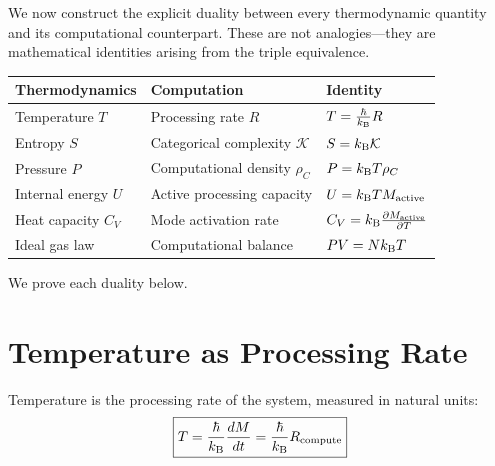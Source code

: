 We now construct the explicit duality between every thermodynamic quantity and its computational counterpart. These are not analogies---they are mathematical identities arising from the triple equivalence.

\begin{center}
\begin{tabular}{lll}
\toprule
\textbf{Thermodynamics} & \textbf{Computation} & \textbf{Identity} \\
\midrule
Temperature $T$ & Processing rate $R$ & $T = \frac{\hbar}{k_{\mathrm{B}}} R$ \\[4pt]
Entropy $S$ & Categorical complexity $\mathcal{K}$ & $S = k_{\mathrm{B}} \mathcal{K}$ \\[4pt]
Pressure $P$ & Computational density $\rho_C$ & $P = k_{\mathrm{B}} T \rho_C$ \\[4pt]
Internal energy $U$ & Active processing capacity & $U = k_{\mathrm{B}} T M_{\mathrm{active}}$ \\[4pt]
Heat capacity $C_V$ & Mode activation rate & $C_V = k_{\mathrm{B}} \frac{\partial M_{\mathrm{active}}}{\partial T}$ \\[4pt]
Ideal gas law & Computational balance & $PV = Nk_{\mathrm{B}} T$ \\
\bottomrule
\end{tabular}
\end{center}

We prove each duality below.

\section{Temperature as Processing Rate}
\label{sec:temp_rate}

\begin{theorem}
\label{thm:temp_rate}
Temperature is the processing rate of the system, measured in natural units:
\begin{equation}
\boxed{T = \frac{\hbar}{k_{\mathrm{B}}} \frac{dM}{dt} = \frac{\hbar}{k_{\mathrm{B}}} R_{\mathrm{compute}}}
\end{equation}
\end{theorem}

